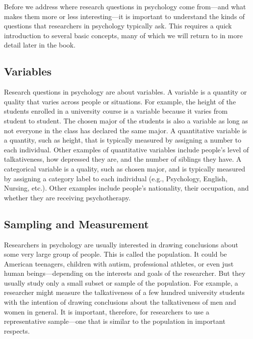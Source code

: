  Before we address where research questions in psychology come from---and what makes them more or less interesting---it is important to understand the kinds of questions that researchers in psychology typically ask. This requires a quick introduction to several basic concepts, many of which we will return to in more detail later in the book.
 
 \subsection{Variables}
 Research questions in psychology are about variables. A variable is a quantity or quality that varies across people or situations. For example, the height of the students enrolled in a university course is a variable because it varies from student to student. The chosen major of the students is also a variable as long as not everyone in the class has declared the same major. A quantitative variable is a quantity, such as height, that is typically measured by assigning a number to each individual. Other examples of quantitative variables include people's level of talkativeness, how depressed they are, and the number of siblings they have. A categorical variable is a quality, such as chosen major, and is typically measured by assigning a category label to each individual (e.g., Psychology, English, Nursing, etc.). Other examples include people's nationality, their occupation, and whether they are receiving psychotherapy.
 
\subsection{Sampling and Measurement}
Researchers in psychology are usually interested in drawing conclusions about some very large group of people. This is called the population. It could be American teenagers, children with autism, professional athletes, or even just human beings---depending on the interests and goals of the researcher. But they usually study only a small subset or sample of the population. For example, a researcher might measure the talkativeness of a few hundred university students with the intention of drawing conclusions about the talkativeness of men and women in general. It is important, therefore, for researchers to use a representative sample---one that is similar to the population in important respects.

